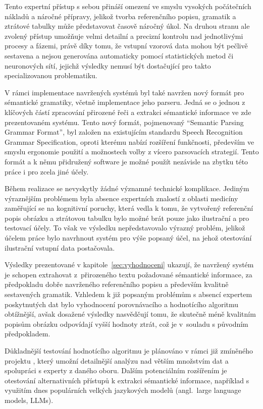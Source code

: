 Tento expertní přístup s sebou přináší omezení ve smyslu vysokých počátečních nákladů a náročné přípravy,
jelikož tvorba referenčního popisu, gramatik a ztrátové tabulky může představovat časově náročný úkol.
Na druhou stranu ale zvolený přístup umožňuje velmi detailní a precizní kontrolu nad jednotlivými procesy a fázemi, právě
díky tomu, že vstupní vzorová data mohou být pečlivě sestavena a nejsou generována automaticky pomocí statistických metod či neuronových sítí,
jejichž výsledky nemusí být dostačující pro takto specializovanou problematiku.

V rámci implementace navržených systémů byl také navržen nový formát pro sémantické gramatiky, včetně implementace jeho parseru.
Jedná se o jednou z klíčových částí zpracování přirozené řeči a extrakci sémantické informace ve zde prezentovaném systému.
Tento nový formát, pojmenovaný \enquote{Semantic Parsing Grammar Format}, byl založen na existujícím standardu Speech Recognition Grammar Specification,
oproti kterému nabízí rozšíření funkčnosti, především ve smyslu ergonomie použití a možnostech volby z vícero parsovacích strategií.
Tento formát a k němu přidružený software je možné použít nezávisle na zbytku této práce i pro zcela jiné účely.

Během realizace se nevyskytly žádné významné technické komplikace.
Jediným výraznějším problémem byla absence expertních znalostí z oblasti medicíny zaměřující se na kognitivní poruchy,
která vedla k tomu, že vytvořený referenční popis obrázku a ztrátovou tabulku bylo možné brát pouze jako ilustrační a pro testovací účely.
To však ve výsledku nepředstavovalo výrazný problém, jelikož účelem práce bylo navrhnout systém pro výše popsaný účel,
na jehož otestování ilustrační vstupní data postačovala.

Výsledky prezentované v kapitole~\ref{sec:vyhodnoceni} ukazují, že navržený systém je schopen extrahovat z~přirozeného
textu požadované sémantické informace, za předpokladu dobře navrženého referenčního popisu a především kvalitně sestavených gramatik.
Vzhledem k již popsaným problémům s absencí expertem poskytnutých dat bylo vyhodnocení porovnávacího a hodnotícího algoritmu
obtížnější, avšak dosažené výsledky nasvědčují tomu, že skutečně méně kvalitním popisům obrázku odpovídají vyšší hodnoty
ztrát, což je v~souladu s původním předpokladem.

Důkladnější testování hodnotícího algoritmu je plánováno v rámci již zmíněného projektu \projekt{},
který umožní detailnější analýzu nad větším množstvím dat a spolupráci s experty z daného oboru.
Dalším potenciálním rozšířením je otestování alternativních přístupů k extrakci sémantické informace,
například s využitím dnes populárních velkých jazykových modelů (angl.~large language models, LLMs).


